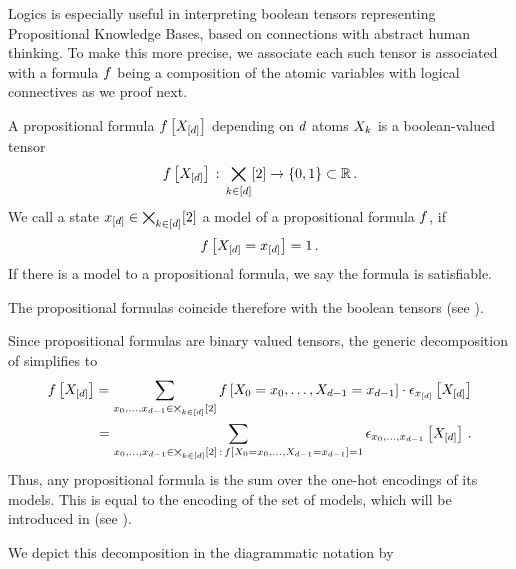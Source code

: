 
Logics is especially useful in interpreting boolean tensors representing Propositional Knowledge Bases, based on connections with abstract human thinking.
To make this more precise, we associate each such tensor is associated with a formula $f$ being a composition of the atomic variables with logical connectives as we proof next.

\begin{definition}
    \label{def:formulas}
    A propositional formula $f\left[X_{[d]}\right]$ depending on $d$ atoms $X_{k}$ is a boolean-valued tensor
    \begin{align*}
        f\left[X_{[d]}\right] \,:\, \bigtimes_{k\in[d]}[2] \rightarrow \{0,1\} \subset \mathbb{R} \, .
    \end{align*}
    We call a state $x_{[d]} \in \bigtimes_{k\in[d]}[2]$ a model of a propositional formula $f$, if
    \begin{align*}
        f\left[X_{[d]}=x_{[d]}\right]=1 \, .
    \end{align*}
    If there is a model to a propositional formula, we say the formula is satisfiable.
\end{definition}

The propositional formulas coincide therefore with the boolean tensors (see ).


Since propositional formulas are binary valued tensors, the generic decomposition of  simplifies to
\begin{align}
    \label{eq:formulaModelDecomposition}
    f\left[X_{[d]}\right] = \sum_{x_{0},\ldots,x_{d-1}\in\bigtimes_{k\in[d]}[2]} f\left[X_{0}=x_{0},\ldots,X_{d-1}=x_{d-1}\right] \cdot \epsilon_{x_{[d]}}\left[X_{[d]}\right] \\
    = \sum_{x_{0},\ldots,x_{d-1}\in\bigtimes_{k\in[d]}[2] \, : \, f\left[X_{0}=x_{0},\ldots,X_{d-1}=x_{d-1}\right]=1}  \epsilon_{x_{0},\ldots,x_{d-1}}\left[X_{[d]}\right] \, .
\end{align}
Thus, any propositional formula is the sum over the one-hot encodings of its models.
This is equal to the encoding of the set of models, which will be introduced in  (see ).

We depict this decomposition in the diagrammatic notation by
\begin{center}
    
\end{center}


